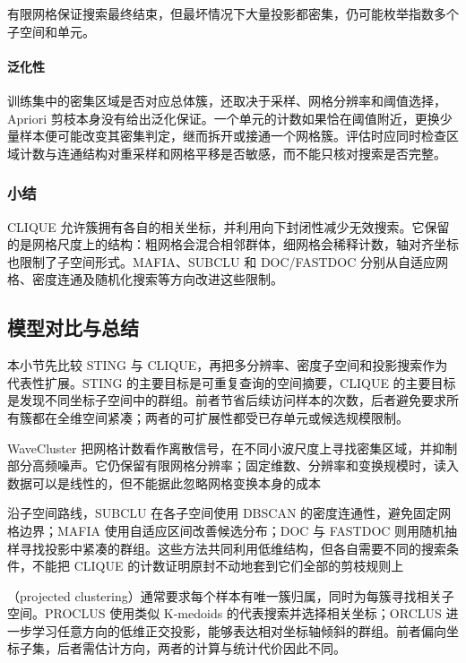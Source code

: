 有限网格保证搜索最终结束，但最坏情况下大量投影都密集，仍可能枚举指数多个子空间和单元。

\paragraph{泛化性}
训练集中的密集区域是否对应总体簇，还取决于采样、网格分辨率和阈值选择，Apriori 剪枝本身没有给出泛化保证。一个单元的计数如果恰在阈值附近，更换少量样本便可能改变其密集判定，继而拆开或接通一个网格簇。评估时应同时检查区域计数与连通结构对重采样和网格平移是否敏感，而不能只核对搜索是否完整。

\subsubsection{小结}

CLIQUE 允许簇拥有各自的相关坐标，并利用向下封闭性减少无效搜索。它保留的是网格尺度上的结构：粗网格会混合相邻群体，细网格会稀释计数，轴对齐坐标也限制了子空间形式。MAFIA、SUBCLU 和 DOC/FASTDOC 分别从自适应网格、密度连通及随机化搜索等方向改进这些限制。

\subsection{模型对比与总结}

本小节先比较 STING 与 CLIQUE，再把多分辨率、密度子空间和投影搜索作为代表性扩展。STING 的主要目标是可重复查询的空间摘要，CLIQUE 的主要目标是发现不同坐标子空间中的群组。前者节省后续访问样本的次数，后者避免要求所有簇都在全维空间紧凑；两者的可扩展性都受已存单元或候选规模限制。

WaveCluster 把网格计数看作离散信号，在不同小波尺度上寻找密集区域，并抑制部分高频噪声。它仍保留有限网格分辨率；固定维数、分辨率和变换规模时，读入数据可以是线性的，但不能据此忽略网格变换本身的成本

沿子空间路线，SUBCLU 在各子空间使用 DBSCAN 的密度连通性，避免固定网格边界；MAFIA 使用自适应区间改善候选分布；DOC 与 FASTDOC 则用随机抽样寻找投影中紧凑的群组。这些方法共同利用低维结构，但各自需要不同的搜索条件，不能把 CLIQUE 的计数证明原封不动地套到它们全部的剪枝规则上

（projected clustering）通常要求每个样本有唯一簇归属，同时为每簇寻找相关子空间。PROCLUS 使用类似 K-medoids 的代表搜索并选择相关坐标；ORCLUS 进一步学习任意方向的低维正交投影，能够表达相对坐标轴倾斜的群组。前者偏向坐标子集，后者需估计方向，两者的计算与统计代价因此不同。

